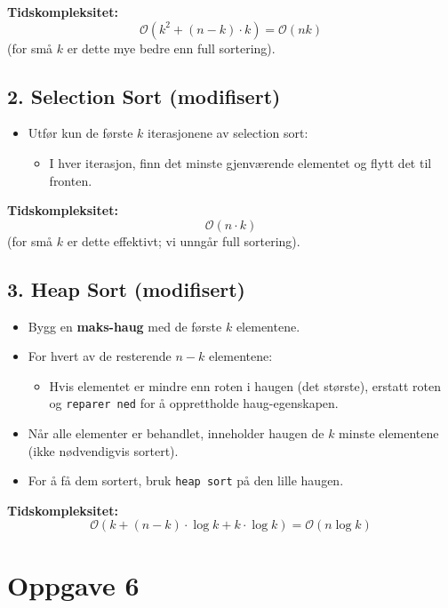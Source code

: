 \documentclass[12pt]{article}
\begin{document}
\noindent
\textbf{Tidskompleksitet:} 
\[
\mathcal{O}(k^2 + (n-k) \cdot k) = \mathcal{O}(nk)
\]
(for små $k$ er dette mye bedre enn full sortering).

\subsection*{2. Selection Sort (modifisert)}

\begin{itemize}
  \item Utfør kun de første $k$ iterasjonene av selection sort:
  \begin{itemize}
    \item I hver iterasjon, finn det minste gjenværende elementet og 
    flytt det til fronten.
  \end{itemize}
\end{itemize}

\noindent
\textbf{Tidskompleksitet:}
\[
\mathcal{O}(n \cdot k)
\]
(for små $k$ er dette effektivt; vi unngår full sortering).

\subsection*{3. Heap Sort (modifisert)}

\begin{itemize}
  \item Bygg en \textbf{maks-haug} med de første $k$ elementene.
  \item For hvert av de resterende $n-k$ elementene:
  \begin{itemize}
    \item Hvis elementet er mindre enn roten i haugen (det største), 
    erstatt roten og \texttt{reparer ned} for å opprettholde haug-egenskapen.
  \end{itemize}
  \item Når alle elementer er behandlet, inneholder haugen de $k$ minste 
  elementene (ikke nødvendigvis sortert).
  \item For å få dem sortert, bruk \texttt{heap sort} på den lille haugen.
\end{itemize}

\textbf{Tidskompleksitet:}
\[
\mathcal{O}(k + (n-k) \cdot \log k + k \cdot \log k) = \mathcal{O}(n \log k)
\]

\section*{Oppgave 6}
\end{document}
